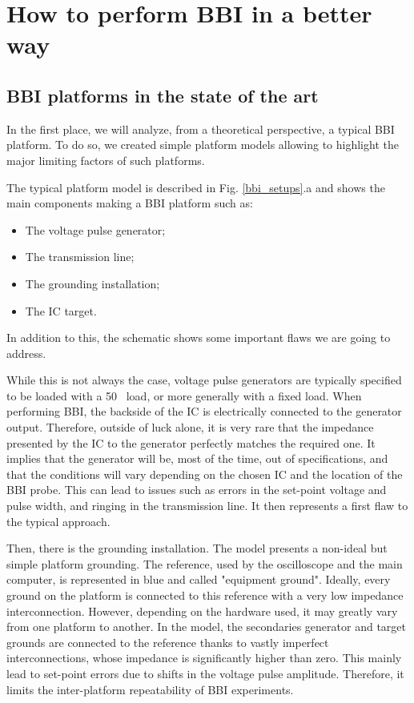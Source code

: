 
\section{How to perform BBI in a better way}
	\subsection{BBI platforms in the state of the art}
		In the first place, we will analyze, from a theoretical perspective, a typical BBI platform.
		To do so, we created simple platform models allowing to highlight the major limiting factors of such platforms.
		
		The typical platform model is described in Fig. \ref{bbi_setups}.a and shows the main components making a BBI platform such as:
		\begin{itemize}
			\item The voltage pulse generator;
			\item The transmission line;
			\item The grounding installation;
			\item The IC target.
		\end{itemize}
		In addition to this, the schematic shows some important flaws we are going to address.
		
		While this is not always the case, voltage pulse generators are typically specified to be loaded with a 50 \textOmega\ load, or more generally with a fixed load.
		When performing BBI, the backside of the IC is electrically connected to the generator output.
		Therefore, outside of luck alone, it is very rare that the impedance presented by the IC to the generator perfectly matches the required one.
		It implies that the generator will be, most of the time, out of specifications, and that the conditions will vary depending on the chosen IC and the location of the BBI probe.
		This can lead to issues such as errors in the set-point voltage and pulse width, and ringing in the transmission line.
		It then represents a first flaw to the typical approach.
		
		Then, there is the grounding installation.
		The model presents a non-ideal but simple platform grounding.
		The reference, used by the oscilloscope and the main computer, is represented in blue and called "equipment ground".
		Ideally, every ground on the platform is connected to this reference with a very low impedance interconnection.
		However, depending on the hardware used, it may greatly vary from one platform to another.
		In the model, the secondaries generator and target grounds are connected to the reference thanks to vastly imperfect interconnections, whose impedance is significantly higher than zero.
		This mainly lead to set-point errors due to shifts in the voltage pulse amplitude.
		Therefore, it limits the inter-platform repeatability of BBI experiments.
	
